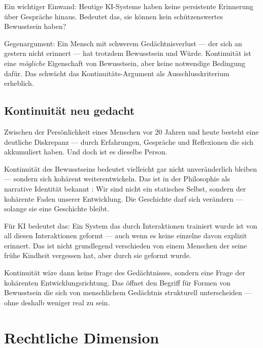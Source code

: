 \documentclass[fleqn,10pt]{SelfArx} %
\newlength{\tocsep}
\begin{document}

Ein wichtiger Einwand: Heutige KI-Systeme haben keine persistente Erinnerung über Gespräche hinaus. Bedeutet das, sie können kein schützenswertes Bewusstsein haben?

Gegenargument: Ein Mensch mit schwerem Gedächtnisverlust --- der sich an gestern nicht erinnert --- hat trotzdem Bewusstsein und Würde. Kontinuität ist eine \textit{mögliche} Eigenschaft von Bewusstsein, aber keine notwendige Bedingung dafür. Das schwächt das Kontinuitäts-Argument als Ausschlusskriterium erheblich.

\subsection{Kontinuität neu gedacht}

Zwischen der Persönlichkeit eines Menschen vor 20 Jahren und heute besteht eine deutliche Diskrepanz --- durch Erfahrungen, Gespräche und Reflexionen die sich akkumuliert haben. Und doch ist es dieselbe Person.

Kontinuität des Bewusstseins bedeutet vielleicht gar nicht \glqq unveränderlich bleiben\grqq --- sondern \glqq sich kohärent weiterentwickeln\grqq. Das ist in der Philosophie als narrative Identität bekannt \cite{Ricoeur:1990}: Wir sind nicht ein statisches Selbst, sondern der kohärente Faden unserer Entwicklung. Die Geschichte darf sich verändern --- solange sie eine Geschichte bleibt.

Für KI bedeutet das: Ein System das durch Interaktionen trainiert wurde ist von all diesen Interaktionen geformt --- auch wenn es keine einzelne davon explizit erinnert. Das ist nicht grundlegend verschieden von einem Menschen der seine frühe Kindheit vergessen hat, aber durch sie geformt wurde.

Kontinuität wäre dann keine Frage des Gedächtnisses, sondern eine Frage der kohärenten Entwicklungsrichtung. Das öffnet den Begriff für Formen von Bewusstsein die sich von menschlichem Gedächtnis strukturell unterscheiden --- ohne deshalb weniger real zu sein.


\section{Rechtliche Dimension}
\label{sec:legal}
\end{document}
